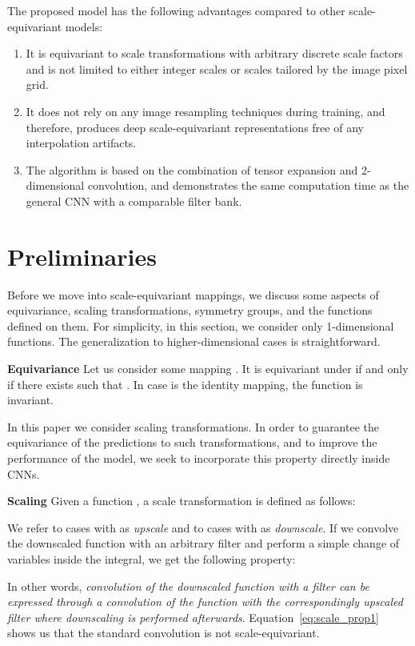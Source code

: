 \documentclass{article} \usepackage{multirow}
\def\Eqref#1{Equation~\ref{#1}}
\begin{document}
\vspace{5mm}
The proposed model has the following 
advantages compared to other scale-equivariant models:
\begin{enumerate}
    \item It is equivariant to scale transformations with arbitrary discrete scale factors 
        and is not limited to either integer scales or 
        scales tailored by the image pixel grid.
    \item It does not rely on any image resampling techniques during training, and therefore, 
        produces deep scale-equivariant representations free of any interpolation artifacts.
    \item The algorithm is based on the combination of 
        tensor expansion and 2-dimensional convolution, and demonstrates the same 
        computation time as the general CNN with a  comparable filter bank.
\end{enumerate} \section{Preliminaries}
\label{sec:prelim}
Before we move into scale-equivariant mappings, we discuss some aspects of equivariance, 
scaling transformations, symmetry groups, and the functions defined on them.
For simplicity, in this section, we consider only 1-dimensional functions. 
The generalization to higher-dimensional cases is straightforward. 


\textbf{Equivariance}
Let us consider some mapping . It is
equivariant under  if and only if 
there exists  such that 
. In case 
 is the identity mapping, the function  is invariant. 

In this paper we consider scaling transformations. In order to guarantee the equivariance 
of the predictions to such transformations, and to improve the performance of the model, we seek to incorporate this property directly inside CNNs.

\textbf{Scaling}
Given a function , a scale transformation is defined as follows:


We refer to cases with  as \textit{upscale} and to cases with  as \textit{downscale}. 
If we convolve the downscaled function with an arbitrary filter  and 
perform a simple change of variables inside the integral, we get the following property:


In other words, \textit{convolution of the downscaled function with a filter can 
be expressed through a convolution of the function 
with the correspondingly 
upscaled filter where downscaling is performed afterwards}.
\Eqref{eq:scale_prop1} shows us that the standard convolution is not scale-equivariant.
\end{document}
